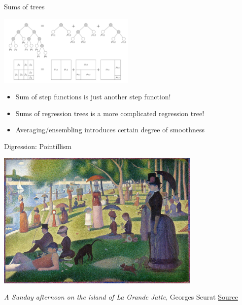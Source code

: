 \documentclass[aspectratio=199]{beamer}
\begin{document}
\begin{frame}{Sums of trees}

\begin{center}
\includegraphics[width = 0.5\textwidth]{figures/sum_of_trees}
\end{center}

\begin{itemize}
\item{Sum of step functions is just another step function!}
\item{Sums of regression trees is a more complicated regression tree!}
\item[\Smiley]{Averaging/ensembling introduces certain degree of smoothness}

\end{itemize}

\end{frame}

\begin{frame}{Digression: Pointillism}


\begin{center}
\includegraphics[width = 0.75\textwidth]{figures/seurat_full}
\end{center}

\textit{A Sunday afternoon on the island of La Grande Jatte}, Georges Seurat \href{https://commons.wikimedia.org/wiki/File:A_Sunday_on_La_Grande_Jatte,_Georges_Seurat,_1884.jpg}{Source}

\end{frame}
\end{document}
